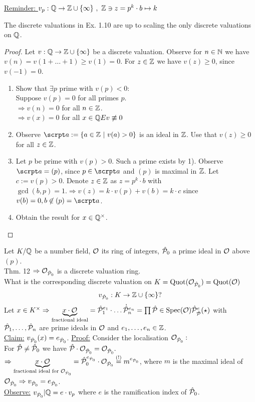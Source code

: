 
\underline{Reminder: }
$v_p: \mathbb{Q} \to \mathbb{Z} \cup \{\infty\} \ , \ \mathbb{Z} \ni z =p^k\cdot b \mapsto k$

\begin{Prop}
The discrete valuations in Ex. 1.10 are up to scaling the only discrete valuations on $\mathbb{Q}$.
\end{Prop}

\begin{proof}
Let $v: \mathbb{Q} \to \mathbb{Z} \cup \{\infty\}$ be a discrete valuation. Observe for $n \in \mathbb{N}$ we have $v(n)=v(1+\dots +1) \geq v(1)=0$. For $z \in \mathbb{Z}$ we have $v(z)\geq 0$, since $v(-1)=0$.
\begin{enumerate}[1)]
\item Show that $\exists p$ prime with $v(p)<0$:\\
Suppose $v(p)=0$ for all primes $p$.\\
$\Rightarrow v(n)=0$ for all $n \in \mathbb{Z}$.\\
$\Rightarrow v(x)=0$ for all $x \in \Q \Lightning v \not \equiv 0$
\item Observe $\a:=\{a \in \Z \ | \ v(a) >0 \}$ is an ideal in $\mathbb{Z}$. Use that $v(z) \geq 0$ for all $z\in \mathbb{Z}$.
\item Let $p$ be prime with $v(p) >0$. Such a prime exists by 1). Observe $\a=(p)$, since $p \in \a$ and $(p)$ is maximal in $\mathbb{Z}$. Let $c:=v(p)>0$. Denote $z \in \mathbb{Z}$ as $z=p^k\cdot b$ with $\gcd(b,p)=1. \Rightarrow v(z)=k \cdot v(p) + v(b) = k\cdot c$ since $v(b)=0, b\not \in (p) = \a$.
\item Obtain the result for $x \in \mathbb{Q}^\times$.
\end{enumerate}
\end{proof}

\begin{Bsp}
Let $K/\mathbb{Q}$ be a number field, $\mathcal{O}$ its ring of integers, $\hat{\mathcal{P}}_0$ a prime ideal in $\mathcal{O}$ above $(p)$.\\
Thm. 12 $\Rightarrow \mathcal{O}_{\hat{\mathcal{P}}_0}$ is a discrete valuation ring.\\
What is the corresponding discrete valuation on $K=\operatorname{Quot}(\mathcal{O}_{\hat{\mathcal{P}}_0})=\operatorname{Quot}(\mathcal{O})$
\[v_{\hat{\mathcal{P}}_0}: K \to \mathbb{Z} \cup \{\infty\} ?\]Let $x \in K^\times \Rightarrow \underbrace{x \cdot \mathcal{O}}_{\text{fractional ideal}}=\hat{\mathcal{P}}^{e_1}_1 \cdot \ldots \dot {\hat{\mathcal{P}}}^{e_n}_n = \prod \hat{\mathcal{P}} \in \operatorname{Spec}(\mathcal{O}) \hat{\mathcal{P}}^e_{\hat{\mathcal{P}}} (\star)$ with $\hat{\mathcal{P}}_1, \ldots, \hat{\mathcal{P}}_n$ are prime ideals in $\mathcal{O}$ and $e_1, \ldots, e_n \in \mathbb{Z}$.\\
\underline{Claim:} $v_{\hat{\mathcal{P}}_0}(x)=e_{\hat{\mathcal{P}}_0}$.
\underline{Proof:} Consider the localisation $\mathcal{O}_{\hat{\mathcal{P}}_0}:$\\

For $\hat{\mathcal{P}} \neq \hat{\mathcal{P}}_0$ we have $\hat{\mathcal{P}} \cdot \mathcal{O}_{\hat{\mathcal{P}}_0} = \mathcal{O}_{\hat{\mathcal{P}}_0}.$\\
$\Rightarrow \underbrace{x \cdot \mathcal{O}}_{\text{fractional ideal for }\mathcal{O}_{\hat{\mathcal{P}}_0}}
 = \hat{\mathcal{P}}^{e_{\hat{\mathcal{P}}_0}}_0 \cdot \mathcal{O}_{\hat{\mathcal{P}}_0} \stackrel{(!)}{=}m^{e_{\hat{\mathcal{P}}_0}}$, where $m$ is the maximal ideal of $\mathcal{O}_{\hat{\mathcal{P}}_0} \Rightarrow v_{\hat{\mathcal{P}}_0} = e_{\hat{\mathcal{P}}_0}$.\\
\underline{Observe:} $v_{\hat{\mathcal{P}}_0}|\mathbb{Q}=e\cdot v_p$ where $e$ is the ramification index of $\hat{\mathcal{P}}_0$.
\end{Bsp}


